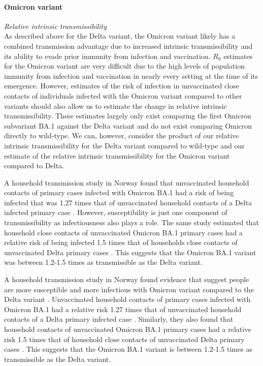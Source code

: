 \paragraph{Omicron variant}

\textit{Relative intrinsic transmissibility}\\
As described above for the Delta variant, the Omicron variant likely has a combined transmission advantage due to increased intrinsic transmissibility and its ability to evade prior immunity from infection and vaccination. 
$R_0$ estimates for the Omicron variant are very difficult due to the high levels of population immunity from infection and vaccination in nearly every setting at the time of its emergence. 
However, estimates of the risk of infection in unvaccinated close contacts of individuals infected with the Omicron variant compared to other variants should 
also allow us to estimate the change in relative intrinsic transmissibility. These estimates largely only exist comparing the first Omicron subvariant BA.1 
against the Delta variant and do not exist comparing Omicron directly to wild-type. 
We can, however, consider the product of our relative intrinsic transmissibility for the Delta variant compared to wild-type and our estimate of the relative 
intrinsic transmissibility for the Omicron variant compared to Delta. 


A household transmission study in Norway found that unvaccinated household contacts of 
primary cases infected with Omicron BA.1 had a risk of being infected that was 1.27 times that of unvaccinated household contacts of a Delta infected primary 
case \cite{jalili2022}. However, susceptibility is just one component of transmissibility as infectiousness also plays a role. 
The same study estimated that household close contacts of unvaccinated Omicron BA.1 primary cases had a relative risk of being infected 1.5 times that of 
households close contacts of unvaccinated Delta primary cases \cite{jalili2022}. This suggests that the Omicron BA.1 variant was between 1.2-1.5 times as 
transmissible as the Delta variant. 

A household transmission study in Norway found evidence that suggest people are more susceptible and more infectious with Omicron variant 
compared to the Delta variant \cite{jalili2022}. Unvaccinated household contacts of primary cases infected with Omicron BA.1 had a relative risk 1.27 
times that of unvaccinated household contacts of a Delta primary infected case \cite{jalili2022}. Similarly, they also found that household contacts of 
unvaccinated Omicron BA.1 primary cases had a relative risk 1.5 times that of household close contacts of unvaccinated Delta primary 
cases \cite{jalili2022}. This suggests that the Omicron BA.1 variant is between 1.2-1.5 times as transmissible as the Delta variant.

